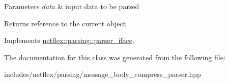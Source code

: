 \begin{DoxyParams}{Parameters}
{\em data} & input data to be parsed \\
\hline
\end{DoxyParams}
\begin{DoxyReturn}{Returns}
reference to the current object 
\end{DoxyReturn}


Implements \hyperlink{classnetflex_1_1parsing_1_1parser__iface_a6b092567e70a5c0bf7568e94d06f7154}{netflex\+::parsing\+::parser\+\_\+iface}.



The documentation for this class was generated from the following file\+:\begin{DoxyCompactItemize}
\item 
includes/netflex/parsing/message\+\_\+body\+\_\+compress\+\_\+parser.\+hpp\end{DoxyCompactItemize}
